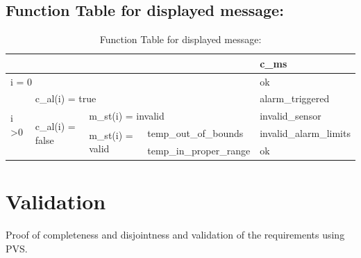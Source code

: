 \documentclass[fontsize=12pt,paper=letter,twoside]{scrartcl}
\begin{document}
\subsection{Function Table for displayed message: }
\begin{table}[htb!]
\centering
\label{my-label}
\begin{tabular}{llll|l|}
\cline{5-5}
                                                        &                                                        &                                                        &                                              & c\_ms                  \\ \hline
\multicolumn{4}{|l|}{i = 0}                                                                                                                                                                                              & ok                     \\ \hline
\multicolumn{1}{|l|}{\multirow{4}{*}{i \textgreater 0}} & \multicolumn{3}{l|}{c\_al(i) = true}                                                                                                                           & alarm\_triggered       \\ \cline{2-5}
\multicolumn{1}{|l|}{}                                  & \multicolumn{1}{l|}{\multirow{3}{*}{c\_al(i) = false}} & \multicolumn{2}{l|}{m\_st(i) = invalid}                                                               & invalid\_sensor        \\ \cline{3-5}
\multicolumn{1}{|l|}{}                                  & \multicolumn{1}{l|}{}                                  & \multicolumn{1}{l|}{\multirow{2}{*}{m\_st(i) = valid}} & temp\_out\_of\_bounds  \footnotemark & invalid\_alarm\_limits \\ \cline{4-5}
\multicolumn{1}{|l|}{}                                  & \multicolumn{1}{l|}{}                                  & \multicolumn{1}{l|}{}                                  & temp\_in\_proper\_range \footnotemark   & ok                     \\ \hline
\end{tabular}
\caption{Function Table for displayed message: }
\end{table}

\section{Validation}
Proof of completeness and disjointness and validation of the requirements using PVS.
\end{document}
